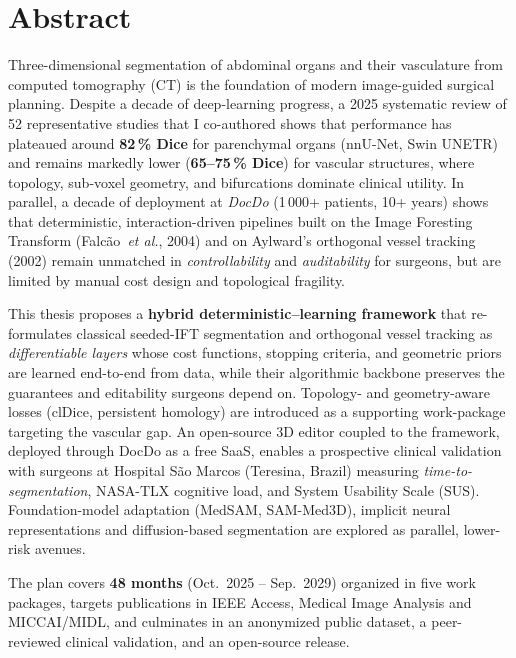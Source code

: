 \documentclass[a4paper,11pt,twoside]{article}
\begin{document}
\section*{Abstract}

Three-dimensional segmentation of abdominal organs and their vasculature from
computed tomography (CT) is the foundation of modern image-guided surgical
planning. Despite a decade of deep-learning progress, a 2025 systematic review
of 52 representative studies that I co-authored shows that performance has
plateaued around \textbf{82\,\% Dice} for parenchymal organs (nnU-Net,
Swin UNETR) and remains markedly lower (\textbf{65--75\,\% Dice}) for vascular
structures, where topology, sub-voxel geometry, and bifurcations dominate
clinical utility. In parallel, a decade of deployment at
\textit{DocDo} (1\,000+ patients, 10+ years) shows that deterministic,
interaction-driven pipelines built on the Image Foresting Transform
(Falc\~ao~\textit{et al.}, 2004) and on Aylward's orthogonal vessel tracking
(2002) remain unmatched in \emph{controllability} and \emph{auditability} for
surgeons, but are limited by manual cost design and topological fragility.

This thesis proposes a \textbf{hybrid deterministic--learning framework} that
re-formulates classical seeded-IFT segmentation and orthogonal vessel tracking
as \emph{differentiable layers} whose cost functions, stopping criteria, and
geometric priors are learned end-to-end from data, while their algorithmic
backbone preserves the guarantees and editability surgeons depend on.
Topology- and geometry-aware losses (clDice, persistent homology)
are introduced as a supporting work-package targeting the
vascular gap. An open-source 3D editor coupled to the framework, deployed
through DocDo as a free SaaS, enables a prospective clinical validation with
surgeons at Hospital S\~ao Marcos (Teresina, Brazil) measuring
\emph{time-to-segmentation}, NASA-TLX cognitive load, and System Usability
Scale (SUS). Foundation-model adaptation (MedSAM, SAM-Med3D), implicit neural
representations and diffusion-based segmentation are explored as parallel,
lower-risk avenues.

The plan covers \textbf{48 months} (Oct.~2025 -- Sep.~2029) organized in five
work packages, targets publications in IEEE Access, Medical Image Analysis and
MICCAI/MIDL, and culminates in an anonymized public dataset, a peer-reviewed
clinical validation, and an open-source release.
\end{document}
